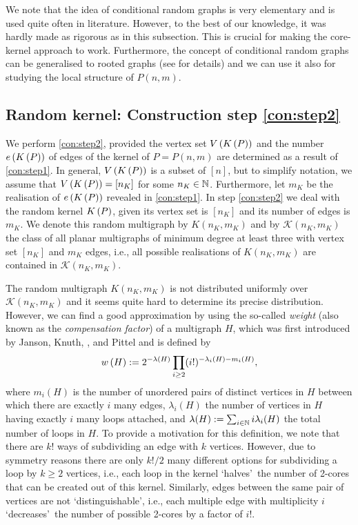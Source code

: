 We note that the idea of conditional random graphs is very elementary and is used quite often in literature. However, to the best of our knowledge, it was hardly made as rigorous as in this subsection. This is crucial for making the core-kernel approach to work. Furthermore, the concept of conditional random graphs can be generalised to rooted graphs (see  for details) and we can use it also for studying the local structure of $P(n,m)$.

\subsection[Random kernel]{Random kernel: Construction step \ref{con:step2}}\label{sub:random_kernel}
We perform \ref{con:step2}, provided the vertex set $V\left(K\left(P\right)\right)$ and the number $e\left({K\left(P\right)}\right)$ of edges of the kernel of $P=P(n,m)$ are determined as a result of \ref{con:step1}. In general, $V\left(K\left(P\right)\right)$ is a subset of $[n]$, but to simplify notation, we assume that $V\left(K\left(P\right)\right)=[n_K]$ for some $n_K\in \mathbb{N}$. Furthermore, let $m_K$ be the realisation of $e\left({K\left(P\right)}\right)$ revealed in \ref{con:step1}. In step \ref{con:step2} we deal with the random kernel $K\left(P\right)$, given its vertex set is $[n_K]$ and its number of edges is $m_K$. We denote this random multigraph by $K(n_K,m_K)$ and by $\mathcal{K}(n_K,m_K)$ the class of all planar multigraphs of minimum degree at least three with vertex set $[n_K]$ and $m_K$ edges, i.e., all possible realisations of $K(n_K,m_K)$ are contained in $\mathcal{K}(n_K,m_K)$. 

The random multigraph $K(n_K,m_K)$ is not distributed uniformly over $\mathcal{K}(n_K,m_K)$ and it seems quite hard to determine its precise distribution. However, we can find a good approximation by using the so-called {\em weight} (also known as the {\em compensation factor}) of a multigraph $H$, which was first introduced by Janson, Knuth, \Luczak, and Pittel \cite{JansonKnuthLuczakPittel1993} and is defined by
\begin{align}\label{eq:4}
  w\left(H\right):=2^{-\lambda(H)}\prod_{i\geq 2} (i!)^{-\lambda_i(H)-m_i(H)},
\end{align}
where $m_i(H)$ is the number of unordered pairs of distinct vertices in $H$ between which there are exactly $i$ many edges, $\lambda_i(H)$ the number of vertices in $H$ having exactly $i$ many loops attached, and $\lambda(H):=\sum_{i\in\mathbb{N}}i\lambda_i(H)$ the total number of loops in $H$. To provide a motivation for this definition, we note that there are $k!$ ways of subdividing an edge with $k$ vertices. However, due to symmetry reasons there are only $k!/2$ many different options for subdividing a loop by $k\geq 2$ vertices, i.e., each loop in the kernel \lq halves\rq\ the number of 2-cores that can be created out of this kernel. Similarly, edges between the same pair of vertices are not \lq distinguishable\rq, i.e., each multiple edge with multiplicity $i$ \lq decreases\rq\ the number of possible 2-cores by a factor of $i!$.

